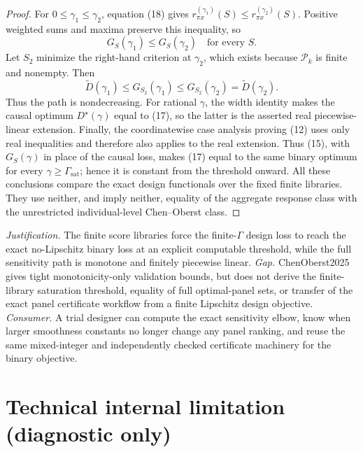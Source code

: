 \documentclass{article}
\begin{document}
\begin{proof}
For \(0\leq\gamma_1\leq\gamma_2\), equation (18) gives
\(r^{(\gamma_1)}_{\pi x}(S)\leq
r^{(\gamma_2)}_{\pi x}(S)\).  Positive weighted sums and maxima preserve
this inequality, so
\[
G_S(\gamma_1)\leq G_S(\gamma_2)
\quad\text{for every }S.                                            \tag{19}
\]
Let \(S_2\) minimize the right-hand criterion at \(\gamma_2\), which
exists because \(\mathcal P_k\) is finite and nonempty.  Then
\[
\widetilde D(\gamma_1)
\leq G_{S_2}(\gamma_1)
\leq G_{S_2}(\gamma_2)
=\widetilde D(\gamma_2).                                            \tag{20}
\]
Thus the path is nondecreasing.  For rational \(\gamma\), the width
identity makes the causal optimum \(D^\star(\gamma)\) equal to (17), so
the latter is the asserted real piecewise-linear extension.  Finally, the
coordinatewise case analysis proving (12) uses only real inequalities and
therefore also applies to the real extension.  Thus (15), with
\(G_S(\gamma)\) in place of the causal loss, makes (17) equal to the same
binary optimum for every \(\gamma\geq\Gamma_{\mathrm{sat}}\); hence it is
constant from the threshold onward.  All these conclusions compare the exact design
functionals over the fixed finite libraries.  They use neither, and imply
neither, equality of the aggregate response class with the unrestricted
individual-level Chen--Oberst class.
\end{proof}
\par\smallskip\noindent \textit{Justification.} The finite score libraries force the finite-\(\Gamma\) design loss to reach the exact no-Lipschitz binary loss at an explicit computable threshold, while the full sensitivity path is monotone and finitely piecewise linear. \textit{Gap.} ChenOberst2025 gives tight monotonicity-only validation bounds, but does not derive the finite-library saturation threshold, equality of full optimal-panel sets, or transfer of the exact panel certificate workflow from a finite Lipschitz design objective. \textit{Consumer.} A trial designer can compute the exact sensitivity elbow, know when larger smoothness constants no longer change any panel ranking, and reuse the same mixed-integer and independently checked certificate machinery for the binary objective.

\section*{Technical internal limitation (diagnostic only)}
\end{document}
